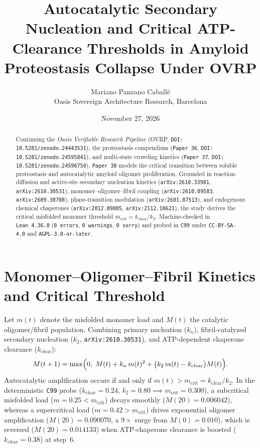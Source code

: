 \documentclass[11pt,a4paper]{article}
\title{Autocatalytic Secondary Nucleation and Critical ATP-Clearance Thresholds in Amyloid Proteostasis Collapse Under OVRP}
\author{Mariano Panzano Caball\'e \\ \small Oasis Sovereign Architecture Research, Barcelona}
\date{November 27, 2026}
\begin{document}
\maketitle

\begin{abstract}
Continuing the \emph{Oasis Verifiable Research Pipeline} (OVRP, \texttt{DOI: 10.5281/zenodo.24443531}), the proteostasis compendium (\texttt{Paper~36}, \texttt{DOI: 10.5281/zenodo.24595841}), and multi-state crowding kinetics (\texttt{Paper~37}, \texttt{DOI: 10.5281/zenodo.24596750}), \texttt{Paper~38} models the critical transition between soluble proteostasis and autocatalytic amyloid oligomer proliferation. Grounded in reaction-diffusion and active-site secondary nucleation kinetics (\texttt{arXiv:2610.33981}, \texttt{arXiv:2610.30531}), monomer--oligomer--fibril coupling (\texttt{arXiv:2610.09583}, \texttt{arXiv:2609.38708}), phase-transition modulation (\texttt{arXiv:2601.07513}), and endogenous chemical chaperones (\texttt{arXiv:2012.09805}, \texttt{arXiv:2112.10621}), the study derives the critical misfolded monomer threshold $m_{\mathrm{crit}} = k_{\mathrm{clear}} / k_2$. Machine-checked in \texttt{Lean~4.36.0} (\texttt{0~errors}, \texttt{0~warnings}, \texttt{0~sorry}) and probed in \texttt{C99} under \texttt{CC-BY-SA-4.0} and \texttt{AGPL-3.0-or-later}.
\end{abstract}

\section{Monomer--Oligomer--Fibril Kinetics and Critical Threshold}
Let $m(t)$ denote the misfolded monomer load and $M(t)$ the catalytic oligomer/fibril population. Combining primary nucleation ($k_n$), fibril-catalyzed secondary nucleation ($k_2$, \texttt{arXiv:2610.30531}), and ATP-dependent chaperone clearance ($k_{\mathrm{clear}}$):
\begin{equation}
M(t+1) = \max\Bigl(0,\; M(t) + k_n\,m(t)^2 + \bigl(k_2\,m(t) - k_{\mathrm{clear}}\bigr)M(t)\Bigr).
\end{equation}
Autocatalytic amplification occurs if and only if $m(t) > m_{\mathrm{crit}} = k_{\mathrm{clear}} / k_2$. In the deterministic \texttt{C99} probe ($k_{\mathrm{clear}} = 0.24$, $k_2 = 0.80 \implies m_{\mathrm{crit}} = 0.300$), a subcritical misfolded load ($m = 0.25 < m_{\mathrm{crit}}$) decays smoothly ($M(20) = 0.006042$), whereas a supercritical load ($m = 0.42 > m_{\mathrm{crit}}$) drives exponential oligomer amplification ($M(20) = 0.090070$, a $9\times$ surge from $M(0) = 0.010$), which is reversed ($M(20) = 0.014133$) when ATP-chaperone clearance is boosted ($k_{\mathrm{clear}} = 0.38$) at step~6.
\end{document}
